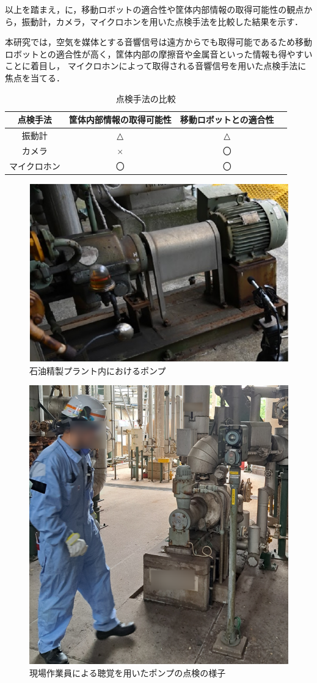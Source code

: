 \documentclass[../main]{subfiles}
\begin{document}
以上を踏まえ，に，移動ロボットの適合性や筐体内部情報の取得可能性の観点から，振動計，カメラ，マイクロホンを用いた点検手法を比較した結果を示す．

本研究では，空気を媒体とする音響信号は遠方からでも取得可能であるため移動ロボットとの適合性が高く，筐体内部の摩擦音や金属音といった情報も得やすいことに着目し，
マイクロホンによって取得される音響信号を用いた点検手法に焦点を当てる．



\begin{table}[htbp]
  \centering
  \caption{点検手法の比較}
  \label{tab:synthesis}
  \begin{tabular}{|c|c|c|c|}
  \hline
  点検手法           & 筐体内部情報の取得可能性 & 移動ロボットとの適合性 \\ \hline
  振動計              & △                     & △                   \\ \hline
  カメラ             & ×                     & 〇                   \\ \hline
  マイクロホン     & 〇                     & 〇                   \\ \hline
  \end{tabular}
\end{table}

\begin{figure}[t]
  \centering
  \includegraphics[keepaspectratio, width=0.8\linewidth]{chap1/pump.pdf}
  \caption{石油精製プラント内におけるポンプ}
  \label{fig:pump}
\end{figure}

\begin{figure}[t]
  \centering
  \includegraphics[keepaspectratio, width=0.8\linewidth]{chap1/monitoring.png}
  \caption{現場作業員による聴覚を用いたポンプの点検の様子}
  \label{fig:monitoring}
\end{figure}
\end{document}
